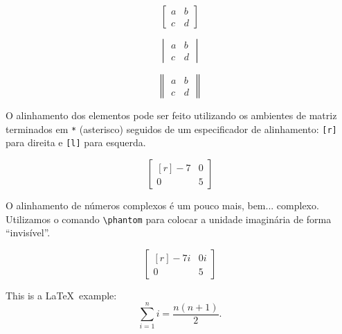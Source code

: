 \documentclass{gjvnq-livreto}
\begin{document}
\begin{latexExampleSide}
\[ \begin{bmatrix} 
a & b \\
c & d 
\end{bmatrix} \]
\end{latexExampleSide}

\begin{latexExampleSide}
\[ \begin{vmatrix} 
a & b \\
c & d 
\end{vmatrix} \]
\end{latexExampleSide}

\begin{latexExampleSide}
\[ \begin{Vmatrix} 
a & b \\
c & d 
\end{Vmatrix} \]
\end{latexExampleSide}

O alinhamento dos elementos pode ser feito utilizando os ambientes de matriz terminados em \verb|*| (asterisco) seguidos de um especificador de alinhamento: \verb|[r]| para direita e \verb|[l]| para esquerda.

\begin{latexExampleSide}
\[ \begin{bmatrix*}[r]
-7 & 0 \\
0 & 5 
\end{bmatrix*} \]
\end{latexExampleSide}

O alinhamento de números complexos é um pouco mais, bem... complexo. Utilizamos o comando \verb|\phantom| para colocar a unidade imaginária de forma ``invisível''.

\begin{latexExampleSide}
\[ \begin{bmatrix*}[r]
-7i & 0i \\
0\phantom{i} & 5\phantom{i} 
\end{bmatrix*} \]


\end{latexExampleSide}

\begin{latexExample}
This is a \LaTeX\ example:
\begin{equation}
\sum\limits_{i=1}^n i = \frac{n(n+1)}{2}.
\end{equation}
\end{latexExample}
\end{document}

